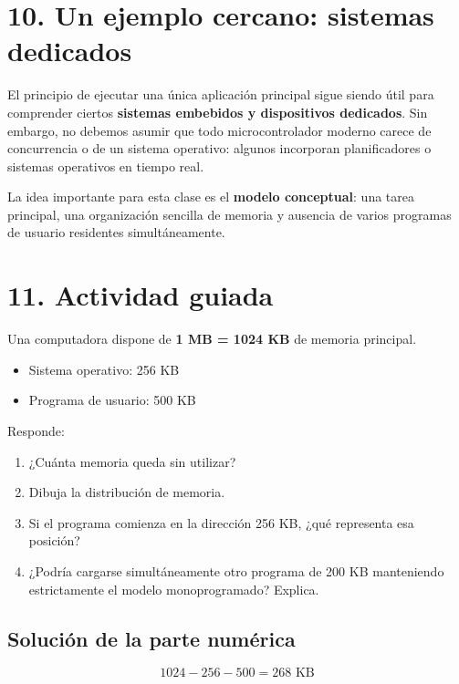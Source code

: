\documentclass[
  spanish,
  letterpaper,
]{scrbook}
\providecommand{\tightlist}{%
  \setlength{\itemsep}{0pt}\setlength{\parskip}{0pt}}
\begin{document}
\section{10. Un ejemplo cercano: sistemas
dedicados}\label{un-ejemplo-cercano-sistemas-dedicados}

El principio de ejecutar una única aplicación principal sigue siendo
útil para comprender ciertos \textbf{sistemas embebidos y dispositivos
dedicados}. Sin embargo, no debemos asumir que todo microcontrolador
moderno carece de concurrencia o de un sistema operativo: algunos
incorporan planificadores o sistemas operativos en tiempo real.

La idea importante para esta clase es el \textbf{modelo conceptual}: una
tarea principal, una organización sencilla de memoria y ausencia de
varios programas de usuario residentes simultáneamente.

\section{11. Actividad guiada}\label{actividad-guiada}

Una computadora dispone de \textbf{1 MB = 1024 KB} de memoria principal.

\begin{itemize}
\tightlist
\item
  Sistema operativo: 256 KB
\item
  Programa de usuario: 500 KB
\end{itemize}

Responde:

\begin{enumerate}
\def\labelenumi{\arabic{enumi}.}
\tightlist
\item
  ¿Cuánta memoria queda sin utilizar?
\item
  Dibuja la distribución de memoria.
\item
  Si el programa comienza en la dirección 256 KB, ¿qué representa esa
  posición?
\item
  ¿Podría cargarse simultáneamente otro programa de 200 KB manteniendo
  estrictamente el modelo monoprogramado? Explica.
\end{enumerate}

\subsection{Solución de la parte
numérica}\label{soluciuxf3n-de-la-parte-numuxe9rica}

\[
1024 - 256 - 500 = 268\text{ KB}
\]
\end{document}

